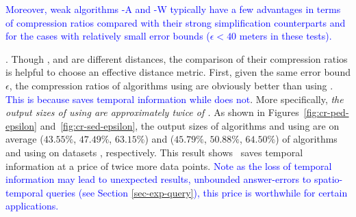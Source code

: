 \textcolor{blue}{Moreover, weak algorithms \operb-A and \cised-W typically have a few advantages in terms of compression ratios compared with their strong simplification counterparts \operb and \cised for the cases with relatively small error bounds (\eg $\epsilon<40$ meters in these tests).}




.
Though \ped, \sed and \dad are different distances, the comparison of their compression ratios is helpful to choose an effective distance metric.
%
First,  given the same error bound $\epsilon$, the compression ratios of algorithms using \ped are obviously better
than using \sed. 
\textcolor{blue}{This is because \sed saves temporal information while \ped does not}.
More specifically, \emph{the output sizes of using \sed are approximately twice of \ped.}
%
As shown in Figures~\ref{fig:cr-ped-epsilon} and~\ref{fig:cr-sed-epsilon}, the output sizes of algorithms \tpa and \dpa
using \ped are on average ($43.55\%$, $47.49\%$, $63.15\%$) and ($45.79\%$,
$50.88\%$, $64.50\%$) of algorithms \tpa and \dpa using \sed on datasets \dSets, respectively.
%
%
This result shows ~\sed saves temporal information at a price of twice more data points. \textcolor{blue}{Note as the loss of temporal information may lead to unexpected results, \eg unbounded answer-errors to spatio-temporal queries (see Section \ref{sec-exp-query}), this price is worthwhile for certain applications. }


